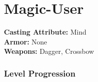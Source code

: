 \section*{Magic-User}%
\begin{multicols}{3}
\begin{mercClassInfo}
\textbf{Casting Attribute:} Mind\\
\textbf{Armor:} None\\
\textbf{Weapons:} Dagger, Crossbow
\end{mercClassInfo}
\end{multicols}
\subsubsection*{Level Progression}
\vspace{-10pt}

